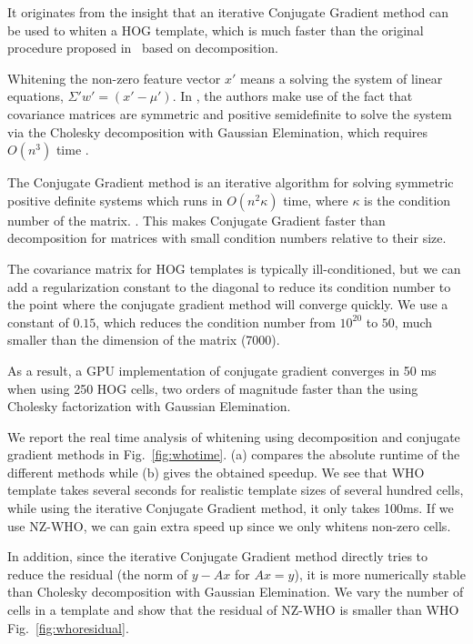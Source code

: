 It originates from the insight that an iterative
Conjugate Gradient method can be used to whiten a HOG template, which
is much faster than the original procedure proposed
in~\cite{Hariharan12} based on decomposition.

Whitening the non-zero
feature vector $x'$ means a solving the system of linear equations, $\Sigma' w' = (x' -
\mu')$. In
\cite{Hariharan12}, the authors make use of the fact that covariance matrices
are symmetric and positive semidefinite to solve the system via the Cholesky
decomposition with Gaussian Elemination, which requires $O(n^3)$ time .

The Conjugate Gradient method is an iterative algorithm for solving symmetric
positive definite systems which runs in $O(n^2\kappa)$ time, where $\kappa$ is
the condition number of the matrix. \cite{Shewchuk94}.
%
This makes Conjugate Gradient faster than decomposition for matrices with small condition
numbers relative to their size.

The covariance matrix for HOG templates is typically ill-conditioned\cite{Hariharan12}, but we
can add a regularization constant to the diagonal to reduce its condition
number to the point where the conjugate gradient method will converge quickly.
We use a constant of $0.15$, which reduces the condition number from $10^{20}$
to $50$, much smaller than the dimension of the matrix (7000).

As a result, a GPU implementation of conjugate gradient converges in 50
ms when using 250 HOG cells, two orders of magnitude faster than the using
Cholesky factorization with Gaussian Elemination.


We report the real time analysis of whitening using decomposition and
conjugate gradient methods in Fig.~\ref{fig:whotime}. (a) compares the
absolute runtime of the different methods while (b) gives the obtained
speedup. We see that %
WHO template takes several seconds for realistic template sizes of
several hundred cells, while using the iterative Conjugate Gradient
method, it only takes 100ms. If we use NZ-WHO, we can gain extra speed
up since we only whitens non-zero cells.

In addition, since the iterative Conjugate Gradient method directly
tries to reduce the residual (the norm of $y-Ax$ for $Ax = y$), it is
more numerically stable than Cholesky decomposition with Gaussian
Elemination. We vary the number of cells in a template and show that
the residual of NZ-WHO is smaller than WHO Fig.~\ref{fig:whoresidual}.

